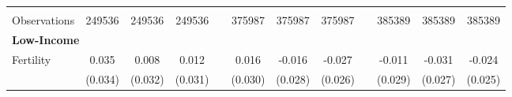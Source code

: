 \begin{landscape}
\begin{table}[htpb!]
\begin{center}
\begin{tabular}{lcccp{2mm}cccp{2mm}ccc}
\begin{footnotesize}\end{footnotesize}&\begin{footnotesize}\end{footnotesize}&\begin{footnotesize}\end{footnotesize}&\begin{footnotesize}\end{footnotesize}&\begin{footnotesize}\end{footnotesize}&\begin{footnotesize}\end{footnotesize}&\begin{footnotesize}\end{footnotesize}&\begin{footnotesize}\end{footnotesize}&\begin{footnotesize}\end{footnotesize}&\begin{footnotesize}\end{footnotesize}&\begin{footnotesize}\end{footnotesize}&\begin{footnotesize}\end{footnotesize}\\Observations&249536&249536&249536&&375987&375987&375987&&385389&385389&385389\\
\multicolumn{12}{l}{\textbf{Low-Income}}\\ 
Fertility&0.035&0.008&0.012&&0.016&-0.016&-0.027&&-0.011&-0.031&-0.024\\
&(0.034)&(0.032)&(0.031)&&(0.030)&(0.028)&(0.026)&&(0.029)&(0.027)&(0.025)\\

\end{tabular}
\end{center}
\end{table}
\end{landscape}
